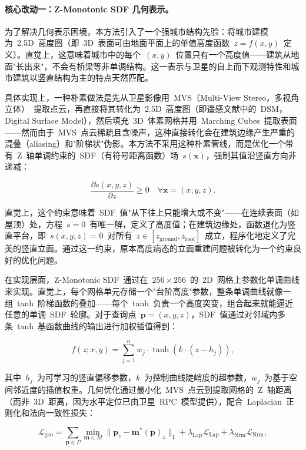 \paragraph{核心改动一：Z-Monotonic SDF 几何表示。}
为了解决几何表示困境，本方法引入了一个强城市结构先验：将城市建模为~2.5D~高度图（即~3D~表面可由地面平面上的单值高度函数~$z = f(x, y)$~定义）。直觉上，这意味着城市中的每个~$(x, y)$~位置只有一个高度值——建筑从地面"长出来"，不会有桥梁等非单调结构。这一表示与卫星的自上而下观测特性和城市建筑以竖直结构为主的特点天然匹配。

具体实现上，一种朴素做法是先从卫星影像用~MVS（Multi-View Stereo，多视角立体）~提取点云，再直接将其转化为~2.5D~高度图（即遥感文献中的~DSM，Digital Surface Model），然后填充~3D~体素网格并用~Marching Cubes~提取表面——然而由于~MVS~点云稀疏且含噪声，这种直接转化会在建筑边缘产生严重的混叠（aliasing）和"阶梯状"伪影。本方法不采用这种朴素管线，而是优化一个带有~Z~轴单调约束的~SDF（有符号距离函数）场~$s(\mathbf{x})$，强制其值沿竖直方向非递减：

\begin{equation}
    \frac{\partial s(x, y, z)}{\partial z} \ge 0 \quad \forall \mathbf{x} = (x, y, z).
\end{equation}

直觉上，这个约束意味着~SDF~值"从下往上只能增大或不变"——在连续表面（如屋顶）处，方程~$s = 0$~有唯一解，定义了高度值；在建筑边缘处，函数退化为竖直平台，即~$s(x, y, z) = 0$~对所有~$z \in [z_{\text{ground}}, z_{\text{roof}}]$~成立，程序化地定义了完美的竖直立面。通过这一约束，原本高度病态的立面重建问题被转化为一个约束良好的优化问题。

在实现层面，Z-Monotonic SDF~通过在~$256 \times 256$~的~2D~网格上参数化单调曲线来实现。直觉上，每个网格单元存储一个"台阶高度"参数，整条单调曲线就像一组~tanh~阶梯函数的叠加——每个~tanh~负责一个高度突变，组合起来就能逼近任意的单调~SDF~轮廓。对于查询点~$\mathbf{p} = (x, y, z)$，SDF~值通过对邻域内多条~tanh~基函数曲线的输出进行加权插值得到：

\begin{equation}
    f(z; x, y) = \sum_{j=1}^{n} w_j \cdot \tanh(k \cdot (z - h_j)),
\end{equation}

其中~$h_j$~为可学习的竖直偏移参数，$k$~为控制曲线陡峭度的超参数，$w_j$~为基于空间邻近度的插值权重。几何优化通过最小化~MVS~点云到提取网格的~Z~轴距离（而非~3D~距离，因为水平定位已由卫星~RPC~模型提供），配合~Laplacian~正则化和法向一致性损失：

\begin{equation}
    \mathcal{L}_{\text{geo}} = \sum_{\mathbf{p} \in P} \min_{\mathbf{m} \in M} \|\mathbf{p}_z - \mathbf{m}^*(\mathbf{p})_z\|_1 + \lambda_{\text{Lap}} \mathcal{L}_{\text{Lap}} + \lambda_{\text{Nrm}} \mathcal{L}_{\text{Nrm}},
\end{equation}

